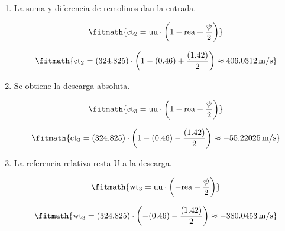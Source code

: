 \begin{enumerate}

\item La suma y diferencia de remolinos dan la entrada.

\[\fitmath{\mathrm{ct}_{2}=\mathrm{uu}\cdot \left(1-\mathrm{rea}+\frac{\psi}{2}\right)}\]

\[\fitmath{\mathrm{ct}_{2}=(324.825)\cdot \left(1-(0.46)+\frac{(1.42)}{2}\right)\approx 406.0312\,\mathrm{m/s}}\]

\item Se obtiene la descarga absoluta.

\[\fitmath{\mathrm{ct}_{3}=\mathrm{uu}\cdot \left(1-\mathrm{rea}-\frac{\psi}{2}\right)}\]

\[\fitmath{\mathrm{ct}_{3}=(324.825)\cdot \left(1-(0.46)-\frac{(1.42)}{2}\right)\approx -55.22025\,\mathrm{m/s}}\]

\item La referencia relativa resta U a la descarga.

\[\fitmath{\mathrm{wt}_{3}=\mathrm{uu}\cdot \left(-\mathrm{rea}-\frac{\psi}{2}\right)}\]

\[\fitmath{\mathrm{wt}_{3}=(324.825)\cdot \left(-(0.46)-\frac{(1.42)}{2}\right)\approx -380.0453\,\mathrm{m/s}}\]

\end{enumerate}

